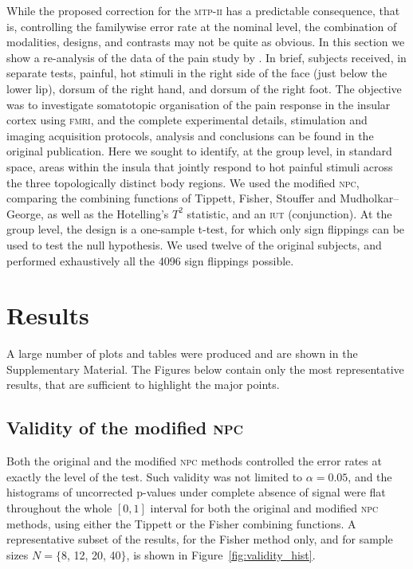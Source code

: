 While the proposed correction for the \textsc{mtp-ii} has a predictable consequence, that is, controlling the familywise error rate at the nominal level, the combination of modalities, designs, and contrasts may not be quite as obvious. In this section we show a re-analysis of the data of the pain study by \citet{Brooks2005}. In brief, subjects received, in separate tests, painful, hot stimuli in the right side of the face (just below the lower lip), dorsum of the right hand, and dorsum of the right foot. The objective was to investigate somatotopic organisation of the pain response in the insular cortex using \textsc{fmri}, and the complete experimental details, stimulation and imaging acquisition protocols, analysis and conclusions can be found in the original publication. Here we sought to identify, at the group level, in standard space, areas within the insula that jointly respond to hot painful stimuli across the three topologically distinct body regions. We used the modified \textsc{npc}, comparing the combining functions of Tippett, Fisher, Stouffer and Mudholkar--George, as well as the Hotelling's $T^2$ statistic, and an \textsc{iut} (conjunction). At the group level, the design is a one-sample t-test, for which only sign flippings can be used to test the null hypothesis. We used twelve of the original subjects, and performed exhaustively all the 4096 sign flippings possible.

\section{Results}

A large number of plots and tables were produced and are shown in the Supplementary Material. The Figures below contain only the most representative results, that are sufficient to highlight the major points.

\subsection{Validity of the modified \textsc{npc}}

Both the original and the modified \textsc{npc} methods controlled the error rates at exactly the level of the test. Such validity was not limited to $\alpha=0.05$, and the histograms of uncorrected p-values under complete absence of signal were flat throughout the whole $[0, 1]$ interval for both the original and modified \textsc{npc} methods, using either the Tippett or the Fisher combining functions. A representative subset of the results, for the Fisher method only, and for sample sizes $N = \{$8, 12, 20, 40$\}$, is shown in Figure~\ref{fig:validity_hist}.

